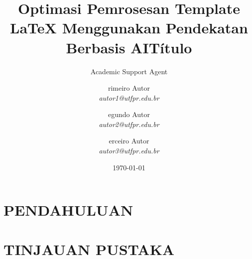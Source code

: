 \documentclass{ppgi-resumo}
\title{Optimasi Pemrosesan Template LaTeX Menggunakan Pendekatan Berbasis AI}
\author{Academic Support Agent}
\date{\today}
\begin{document}
\maketitle

\begin{abstract}

\end{abstract}

\chapter{PENDAHULUAN}


\chapter{TINJAUAN PUSTAKA}


\usepackage{geometry}
\usepackage{enumitem}
\usepackage{lipsum}
\usepackage{expl3}
\usepackage[fontsize=9pt]{fontsize}
\geometry{
 a4paper,
 left=1cm,
 right=1cm,bottom=1cm,top=1.5cm,
 }

\author{
  rimeiro Autor\\
  \textit{autor1@utfpr.edu.br}
  \and
  egundo Autor\\
  \textit{autor2@utfpr.edu.br}
  \and
  erceiro Autor\\
  \textit{autor3@utfpr.edu.br}
}

\title{Título}
\end{document}
